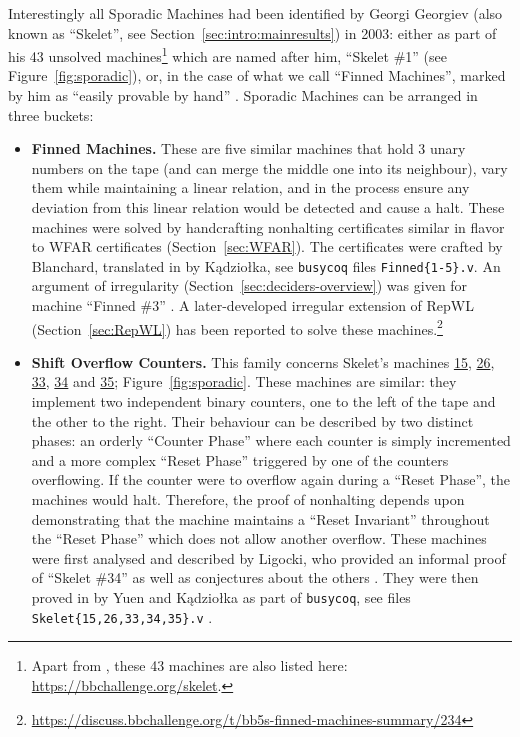 Interestingly all Sporadic Machines had been identified by Georgi Georgiev (also known as ``Skelet'', see Section~\ref{sec:intro:mainresults}) in 2003: either as part of his 43 unsolved machines\footnote{Apart from \cite{Skelet_bbfind_list}, these 43 machines are also listed here: \url{https://bbchallenge.org/skelet}.} which are named after him, \eg ``Skelet \#1'' (see Figure~\ref{fig:sporadic}), or, in the case of what we call ``Finned Machines'', marked by him as ``easily provable by hand'' \cite{Skelet_bbfind_list}. Sporadic Machines can be arranged in three buckets:
\begin{itemize}
    \item \textbf{Finned Machines.} These are five similar machines that hold 3 unary numbers on the tape (and can merge the middle one into its neighbour), vary them while maintaining a linear relation, and in the process ensure any deviation from this linear relation would be detected and cause a halt. These machines were solved by handcrafting nonhalting certificates similar in flavor to WFAR certificates (Section~\ref{sec:WFAR}). The certificates were crafted by Blanchard, translated in \Coq by Kądziołka, see \texttt{busycoq} files \texttt{Finned\{1-5\}.v}. An argument of irregularity (Section~\ref{sec:deciders-overview}) was given for machine ``Finned \#3'' \cite{irregularFinned3}. A later-developed irregular extension of RepWL (Section~\ref{sec:RepWL}) has been reported to solve these machines.\footnote{\url{https://discuss.bbchallenge.org/t/bb5s-finned-machines-summary/234}}
    \item \textbf{Shift Overflow Counters.} This family concerns Skelet's machines \href{https://bbchallenge.org/1RB---_1RC1LB_1LD1RE_1LB0LD_1RA0RC}{15}, \href{https://bbchallenge.org/1RB1LD_1RC0RB_1LA1RC_1LE0LA_1LC---}{26}, \href{https://bbchallenge.org/1RB1LC_0RC0RB_1LD0LA_1LE---_1LA1RE}{33}, \href{https://bbchallenge.org/1RB1LC_0RC0RB_1LD0LA_1LE---_1LA1RA}{34} and \href{https://bbchallenge.org/1RB1LC_0RC0RB_1LD0LA_1LE---_1LA0LA}{35}; Figure~\ref{fig:sporadic}. These machines are similar: they implement two independent binary counters, one to the left of the tape and the other to the right. Their behaviour can be described by two distinct phases: an orderly ``Counter Phase'' where each counter is simply incremented and a more complex ``Reset Phase'' triggered by one of the counters overflowing. If the counter were to overflow again during a ``Reset Phase'', the machines would halt. Therefore, the proof of nonhalting depends upon demonstrating that the machine maintains a ``Reset Invariant'' throughout the ``Reset Phase'' which does not allow another overflow. These machines were first analysed and described by Ligocki, who provided an informal proof of ``Skelet \#34'' as well as conjectures about the others \cite{ShawnSOC}. They were then proved in \Coq by Yuen and Kądziołka as part of \texttt{busycoq}, see files \texttt{Skelet\{15,26,33,34,35\}.v} \cite{busycoq}.

\end{itemize}
